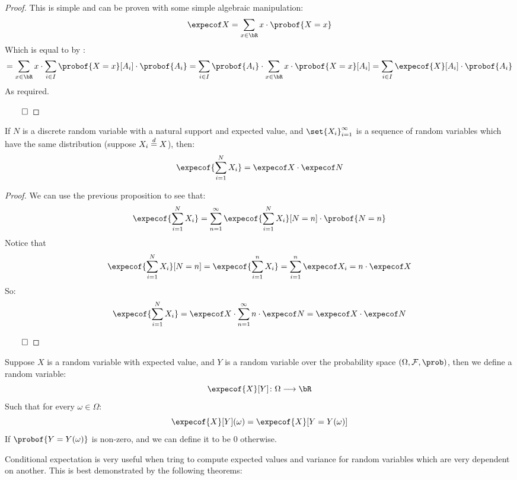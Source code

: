 \begin{proof}

	This is simple and can be proven with some simple algebraic manipulation:
	\[ \expecof X = \sum_{x\in\bR}x\cdot\probof{X=x} \]
	Which is equal to by :
	\[ = \sum_{x\in\bR}x\cdot\sum_{i\in I}\probof{X=x}[A_i]\cdot\probof{A_i}
	= \sum_{i\in I}\probof{A_i}\cdot\sum_{x\in\bR}x\cdot\probof{X=x}[A_i] = \sum_{i\in I}\expecof{X}[A_i]\cdot\probof{A_i} \]
	As required.

	\hfill$\qed$

\end{proof}

\begin{prop*}

	If $N$ is a discrete random variable with a natural support and expected value, and $\set{X_i}_{i=1}^\infty$ is a sequence
	of random variables which have the same distribution (suppose $X_i\mathrel{\overset d=} X$), then:
	\[ \expecof{\sum_{i=1}^N X_i} = \expecof X\cdot\expecof N \]

\end{prop*}

\begin{proof}

	We can use the previous proposition to see that:
	\[ \expecof{\sum_{i=1}^N X_i} = \sum_{n=1}^\infty\expecof{\sum_{i=1}^N X_i}[N=n]\cdot\probof{N=n} \]
	Notice that
	\[ \expecof{\sum_{i=1}^N X_i}[N=n] = \expecof{\sum_{i=1}^n X_i} = \sum_{i=1}^n\expecof X_i = n\cdot\expecof X \]
	So:
	\[ \expecof{\sum_{i=1}^N X_i} = \expecof X\cdot\sum_{n=1}^\infty n\cdot\expecof N = \expecof X\cdot\expecof N \]

	\hfill$\qed$

\end{proof}

\begin{defn*}

	Suppose $X$ is a random variable with expected value, and $Y$ is a random variable over the probability space
	$(\Omega,\cF,\prob)$, then we define a random variable:
	\[ \expecof{X}[Y]\colon\Omega\longrightarrow\bR \]
	Such that for every $\omega\in\Omega$:
	\[ \expecof{X}[Y](\omega) = \expecof{X}[Y=Y(\omega)] \]
	If $\probof{Y=Y(\omega)}$ is non-zero, and we can define it to be $0$ otherwise.

\end{defn*}

Conditional expectation is very useful when tring to compute expected values and variance for random variables which are
very dependent on another.
This is best demonstrated by the following theorems:

